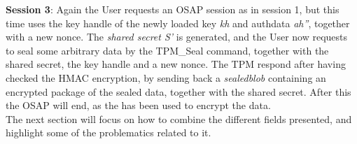 \textbf{Session 3}: Again the User requests an OSAP session as in session 1, but this time uses the key handle of the newly loaded key \textit{kh} and authdata \textit{ah''}, together with a new nonce. The \textit{shared secret S'} is generated, and the User now requests to seal some arbitrary data by the TPM\_Seal command, together with the shared secret, the key handle and a new nonce. The TPM respond after having checked the HMAC encryption, by sending back a \textit{sealedblob} containing an encrypted package of the sealed data, together with the shared secret. After this the OSAP will end, as the has been used to encrypt the data. \\

The next section will focus on how to combine the different fields presented, and highlight some of the problematics related to it.  
% 


